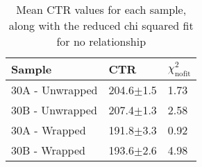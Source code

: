 \begin{table}
\label{tab:doiresults}
\caption{Mean CTR values for each sample, along with the reduced chi squared fit for no relationship}
\begin{tabular}{lll}
\hline
Sample &            CTR &   $\chi^2_\text{nofit}$ \\
\hline
   30A - Unwrapped &  204.6$\pm$1.5 &  1.73 \\
   30B - Unwrapped &  207.4$\pm$1.3 &  2.58 \\
   30A - Wrapped &  191.8$\pm$3.3 &  0.92 \\
   30B - Wrapped &  193.6$\pm$2.6 &  4.98 \\
\hline
\end{tabular}
\end{table}